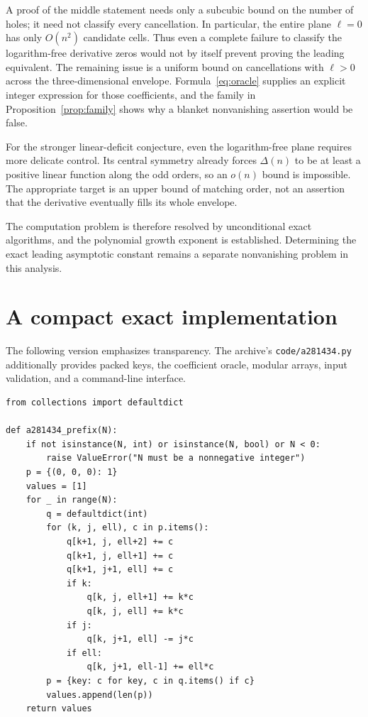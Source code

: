 \documentclass[11pt]{article}
\numberwithin{equation}{section}
\theoremstyle{definition}
\theoremstyle{remark}
\begin{document}
A proof of the middle statement needs only a subcubic bound on the number
of holes; it need not classify every cancellation. In particular, the
entire plane $\ell=0$ has only $O(n^2)$ candidate cells. Thus even a complete
failure to classify the logarithm-free derivative zeros would not by itself
prevent proving the leading equivalent. The remaining issue is a uniform
bound on cancellations with $\ell>0$ across the three-dimensional envelope.
Formula~\eqref{eq:oracle} supplies an explicit integer expression for those
coefficients, and the family in Proposition~\ref{prop:family} shows why a
blanket nonvanishing assertion would be false.

For the stronger linear-deficit conjecture, even the logarithm-free plane
requires more delicate control. Its central symmetry already forces
$\Delta(n)$ to be at least a positive linear function along the odd orders,
so an $o(n)$ bound is impossible. The appropriate target is an upper bound
of matching order, not an assertion that the derivative eventually fills
its whole envelope.

The computation problem is therefore resolved by unconditional exact
algorithms, and the polynomial growth exponent is established. Determining
the exact leading asymptotic constant remains a separate nonvanishing
problem in this analysis.

\clearpage
\appendix
\section{A compact exact implementation}\label{app:code}

The following version emphasizes transparency. The archive's
\texttt{code/a281434.py} additionally provides packed keys, the coefficient
oracle, modular arrays, input validation, and a command-line interface.

\begin{lstlisting}
from collections import defaultdict

def a281434_prefix(N):
    if not isinstance(N, int) or isinstance(N, bool) or N < 0:
        raise ValueError("N must be a nonnegative integer")
    p = {(0, 0, 0): 1}
    values = [1]
    for _ in range(N):
        q = defaultdict(int)
        for (k, j, ell), c in p.items():
            q[k+1, j, ell+2] += c
            q[k+1, j, ell+1] += c
            q[k+1, j+1, ell] += c
            if k:
                q[k, j, ell+1] += k*c
                q[k, j, ell] += k*c
            if j:
                q[k, j+1, ell] -= j*c
            if ell:
                q[k, j+1, ell-1] += ell*c
        p = {key: c for key, c in q.items() if c}
        values.append(len(p))
    return values
\end{lstlisting}
\end{document}
